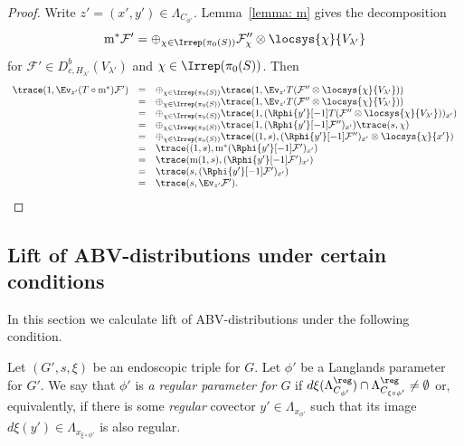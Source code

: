 \documentclass[11pt,letterpaper]{amsart}
\newcommand{\calm}{\textrm{m}}
\numberwithin{equation}{section}
\begin{document}
\begin{proof}
Write $z'=(x',y')\in \Lambda_{C_{\phi'}}$.
Lemma~\ref{lemma: m} gives the decomposition
\[
\calm^*\mathcal{F'} = \oplus_{\chi \in \Irrep(\pi_0(S))} \mathcal{F}_\chi''\otimes\locsys{\chi}{V_{\lambda'}}
\]
for $\mathcal{F'}\in D^b_{c,H_{\lambda'}}(V_{\lambda'})$ and $\chi \in \Irrep(\pi_0(S))$.
Then
\[
\begin{array}{rcl}
\trace(1,\Ev_{z'}(T\circ \calm^*)\mathcal{F'})
&=&\oplus_{\chi \in \Irrep(\pi_0(S))} 
\trace(1,\Ev_{z'}T(\mathcal{F''}\otimes\locsys{\chi}{V_{\lambda'}})) \\
&=&\oplus_{\chi \in \Irrep(\pi_0(S))} 
\trace(1,\Ev_{z'}T(\mathcal{F''}\otimes\locsys{\chi}{V_{\lambda'}})) \\
&=& \oplus_{\chi \in \Irrep(\pi_0(S))} 
\trace(1,(\Rphi{y'}[-1]T(\mathcal{F''}\otimes\locsys{\chi}{V_{\lambda'}}))_{x'}) \\
&=&\oplus_{\chi \in \Irrep(\pi_0(S))} 
\trace(1,(\Rphi{y'}[-1]\mathcal{F''})_{x'}) \trace(s,\chi)\\
&=&\oplus_{\chi \in \Irrep(\pi_0(S))} 
\trace((1,s), (\Rphi{y'}[-1]\mathcal{F''})_{x'} \otimes \locsys{\chi}{{x'}}) \\
&=&
\trace((1,s),\calm^*(\Rphi{y'}[-1]\mathcal{F'})_{x'}) \\
&=&
\trace(\calm(1,s),(\Rphi{y'}[-1]\mathcal{F'})_{x'}) \\
&=&
\trace(s,(\Rphi{y'}[-1]\mathcal{F'})_{x'})\\
&=&
\trace(s,\Ev_{z'}\mathcal{F'}).
\end{array}
\]
\end{proof}


\subsection{Lift of ABV-distributions under certain conditions}\label{subsection: lift of ABV}

In this section we calculate lift of ABV-distributions under the following condition.

\begin{definition}\label{definition: regular parameter}
Let $(G',s,\xi)$ be an endoscopic triple for $G$. 
Let $\phi'$ be a Langlands parameter for $G'$. 
We say that $\phi'$ is  {\it a regular parameter for $G$} if  $d\xi(\Lambda^\reg_{C_{\phi'}}) \cap \Lambda^\reg_{C_{\xi\circ\phi'}}\ne \emptyset$ or, equivalently, if there is some {\it regular} covector $y'\in \Lambda_{x_{\phi'}}$ such that its image $d\xi(y')\in \Lambda_{x_{\xi\circ\phi'}}$ is also regular.
    \end{definition}
\end{document}
